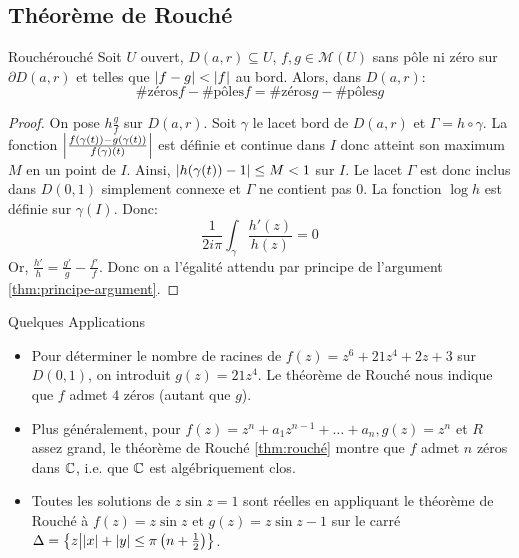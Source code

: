 \documentclass{cours}
\begin{document}
\subsection{Théorème de Rouché}
\begin{théorème}
	{Rouché}{rouché}
	Soit $U$ ouvert, $D(a, r) \subseteq U$, $f, g \in \mathcal{M}(U)$ sans pôle ni zéro sur $\partial D(a, r)$ et telles que $\left|f - g\right| < \left|f\right|$ au bord. Alors, dans $D(a, r)$: 
	\begin{equation*}
		\text{\#zéros} f - \text{\#pôles}f = \text{\#zéros}g - \text{\#pôles}g
	\end{equation*}
\end{théorème}
\begin{proof}
	On pose $h \frac{g}{f}$ sur $D(a, r)$. Soit $\gamma$ le lacet bord de $D(a,r)$ et $\Gamma = h\circ \gamma$.
	La fonction $\left|\frac{f(\gamma(t)) - g(\gamma(t))}{f(\gamma)(t)}\right|$ est définie et continue dans $I$ donc atteint son maximum $M$ en un point de $I$.
	Ainsi, $\left|h(\gamma(t)) - 1\right| \leq M < 1$ sur $I$. 
	Le lacet $\Gamma$ est donc inclus dans $D(0, 1)$ simplement connexe et $\Gamma$ ne contient pas $0$. 
	La fonction $\log h$ est définie sur $\gamma(I)$. Donc: 
	\begin{equation*}
		\frac{1}{2i\pi}\int_{\gamma}\frac{h'(z)}{h(z)} = 0
	\end{equation*}
	Or, $\frac{h'}{h} = \frac{g'}{g} - \frac{f'}{f}$. Donc on a l'égalité attendu par principe de l'argument \ref{thm:principe-argument}.
\end{proof}

\begin{propositionfr}
	{Quelques Applications}{}
	\begin{itemize}
		\item Pour déterminer le nombre de racines de $f(z) = z^{6} + 21z^{4} + 2z + 3$ sur $D(0, 1)$, on introduit $g(z) = 21z^{4}$. Le théorème de Rouché nous indique que $f$ admet $4$ zéros (autant que $g$). 
		\item Plus généralement, pour $f(z) = z^{n} + a_{1}z^{n - 1} + \ldots + a_{n}, g(z) = z^{n}$ et $R$ assez grand, le théorème de Rouché \ref{thm:rouché} montre que $f$ admet $n$ zéros dans $\mathbb{C}$, i.e. que $\mathbb{C}$ est algébriquement clos. 
		\item Toutes les solutions de $z\sin z = 1$ sont réelles en appliquant le théorème de Rouché à $f(z) = z\sin z$ et $g(z) = z\sin z - 1$ sur le carré $\Delta = \left\{z \middle| \left|x\right| + \left|y\right|\leq \pi \left(n + \frac{1}{2}\right)\right\}$.
	\end{itemize}
\end{propositionfr}
\end{document}
